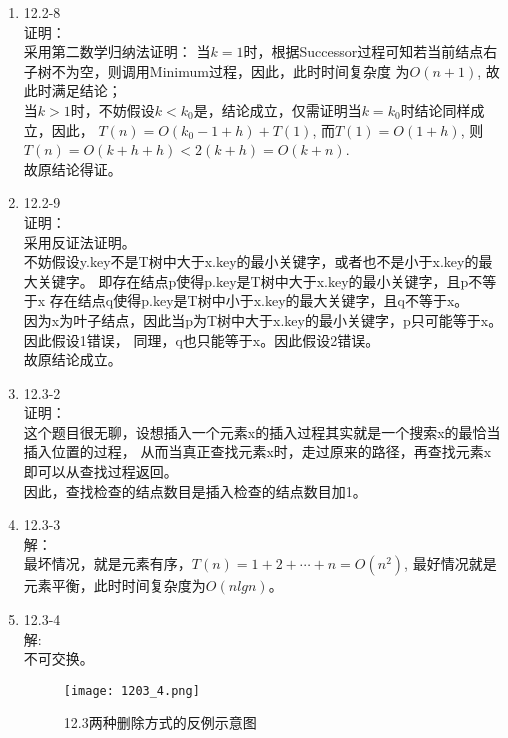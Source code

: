\documentclass[UTF8]{ctexart}
\begin{document}
\begin{enumerate}
	\item 12.2-8 \\
	证明：\\
		采用第二数学归纳法证明：
		当$k=1$时，根据Successor过程可知若当前结点右子树不为空，则调用Minimum过程，因此，此时时间复杂度
		为$O(n+1)$, 故此时满足结论；\\
		当$k>1$时，不妨假设$k<k_0$是，结论成立，仅需证明当$k=k_0$时结论同样成立，因此，
		$T(n) = O(k_0-1+h) + T(1)$, 而$T(1) = O(1+h)$, 则$T(n) = O(k+h+h) < 2(k+h) = O(k+n)$.	\\
		故原结论得证。
	
	\item 12.2-9 \\
	证明：\\
		采用反证法证明。\\
		不妨假设y.key不是T树中大于x.key的最小关键字，或者也不是小于x.key的最大关键字。
		即存在结点p使得p.key是T树中大于x.key的最小关键字，且p不等于x
		  存在结点q使得p.key是T树中小于x.key的最大关键字，且q不等于x。\\
		因为x为叶子结点，因此当p为T树中大于x.key的最小关键字，p只可能等于x。因此假设1错误，
		同理，q也只能等于x。因此假设2错误。\\
		故原结论成立。
		
	\item 12.3-2 \\
	证明：\\
		这个题目很无聊，设想插入一个元素x的插入过程其实就是一个搜索x的最恰当插入位置的过程，
		从而当真正查找元素x时，走过原来的路径，再查找元素x即可以从查找过程返回。\\
		因此，查找检查的结点数目是插入检查的结点数目加1。
	
	\item 12.3-3 \\
	解：\\
		最坏情况，就是元素有序，$T(n) = 1+2+\cdots+n = O(n^2)$,
		最好情况就是元素平衡，此时时间复杂度为$O(nlgn)$。
		
	\item 12.3-4 \\
	解: \\
		不可交换。\\
		\begin{figure}[H]
		\centering
        \caption{12.3两种删除方式的反例示意图}
		\texttt{[image: 1203\_4.png]}
		\end{figure}
	

\end{enumerate}
\end{document}
